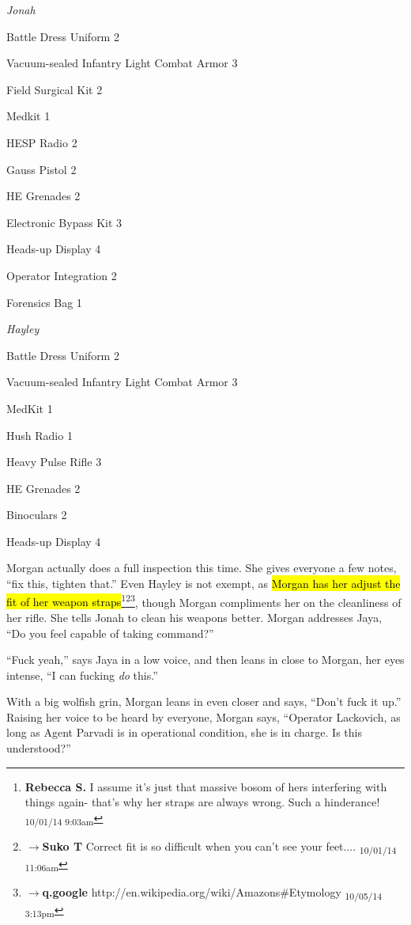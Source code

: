 \textit{Jonah}

{\parskip=0pt
Battle Dress Uniform 2

Vacuum-sealed Infantry Light Combat Armor 3

Field Surgical Kit 2

Medkit 1

HESP Radio 2

Gauss Pistol 2

HE Grenades 2

Electronic Bypass Kit 3

Heads-up Display 4

Operator Integration 2

Forensics Bag 1
}


\textit{Hayley}

{\parskip=0pt
Battle Dress Uniform 2

Vacuum-sealed Infantry Light Combat Armor 3

MedKit 1

Hush Radio 1

Heavy Pulse Rifle 3

HE Grenades 2

Binoculars 2

Heads-up Display 4
}


Morgan actually does a full inspection this time.  She gives everyone a few notes, ``fix this, tighten that.'' Even Hayley is not exempt, as \hl{Morgan has her adjust the fit of her weapon straps}\footnote{\textbf{Rebecca S. }I assume it's just that massive bosom of hers interfering with things again- that's why her straps are always wrong. Such a hinderance! \textsubscript{10/01/14 9:03am}}\footnote{$\rightarrow$\textbf{Suko T }Correct fit is so difficult when you can't see your feet.... \textsubscript{10/01/14 11:06am}}\footnote{$\rightarrow$\textbf{q.google }http://en.wikipedia.org/wiki/Amazons\#Etymology \textsubscript{10/05/14 3:13pm}}, though Morgan compliments her on the cleanliness of her rifle.  She tells Jonah to clean his weapons better.   Morgan addresses Jaya, ``Do you feel capable of taking command?''

``Fuck yeah,'' says Jaya in a low voice, and then leans in close to Morgan, her eyes intense, ``I can fucking \textit{do} this.''

With a big wolfish grin, Morgan leans in even closer and says, ``Don't fuck it up.''  Raising her voice to be heard by everyone, Morgan says, ``Operator Lackovich, as long as Agent Parvadi is in operational condition, she is in charge. Is this understood?''


